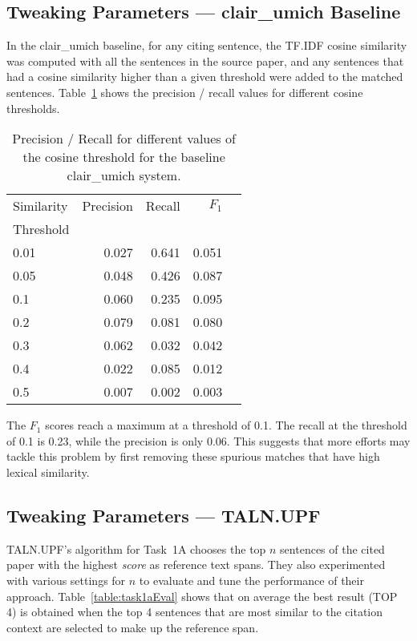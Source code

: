 \documentclass[11pt]{article}
\begin{document}
\subsection{Tweaking Parameters --- clair\_umich Baseline}
In the clair\_umich baseline, for any citing sentence, the TF.IDF
cosine similarity was computed with all the sentences in the source
paper, and any sentences that had a cosine similarity higher than a
given threshold were added to the matched
sentences. Table~\ref{tab:clairumichbaseline} shows the precision /
recall values for different cosine thresholds.
\begin{table}[h]
  \centering
  \begin{tabular}{|l|r|r|r|r|}
  	\hline
	Similarity & Precision & Recall & $F_1$ \\
	Threshold & & & \\
	\hline
	0.01 & 0.027 & 0.641 & 0.051\\
	0.05 & 0.048 & 0.426 & 0.087\\
	0.1 & 0.060 & 0.235 & 0.095\\
	0.2 & 0.079 & 0.081 & 0.080\\
	0.3 & 0.062 & 0.032 & 0.042\\
	0.4 & 0.022 & 0.085 & 0.012\\
	0.5 & 0.007 &  0.002 & 0.003\\
	\hline
  \end{tabular}
  \caption{Precision / Recall for different values of the cosine threshold 
  			for the baseline clair\_umich system.}
  \label{tab:clairumichbaseline}
\end{table}

The $F_1$ scores reach a maximum at a threshold of 0.1. The recall at
the threshold of 0.1 is 0.23, while the precision is only 0.06. This
suggests that more efforts may tackle this problem by first removing
these spurious matches that have high lexical similarity.

\subsection{Tweaking Parameters --- TALN.UPF}
TALN.UPF's algorithm for Task~1A chooses the top $n$ sentences of the
cited paper with the highest \textit{score} as reference text
spans. They also experimented with various settings for $n$ to
evaluate and tune the performance of their approach.
Table~\ref{table:task1aEval} shows that on average the best result
(TOP 4) is obtained when the top 4 sentences that are most similar to the
citation context are selected to make up the reference span.
\end{document}
